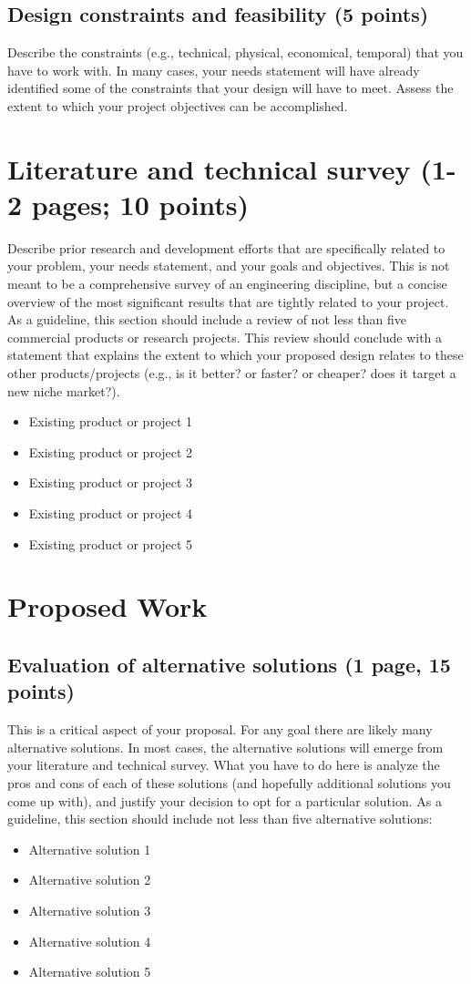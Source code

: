 \documentclass[letterpaper,12pt]{article}
\begin{document}
\subsection{Design constraints and feasibility (5 points)} Describe
the constraints (e.g., technical, physical, economical, temporal)
that you have to work with. In many cases, your needs statement will
have already identified some of the constraints that your design will
have to meet. Assess the extent to which your project objectives can
be accomplished.

\section{Literature and technical survey (1-2 pages; 10 points)} Describe
prior research and development efforts that are specifically related to
your problem, your needs statement, and your goals and objectives. This is
not meant to be a comprehensive survey of an engineering discipline, but a
concise overview of the most significant results that are tightly related
to your project. As a guideline, this section should include a review
of not less than five commercial products or research projects. This
review should conclude with a statement that explains the extent to which
your proposed design relates to these other products/projects (e.g., is
it better? or faster? or cheaper? does it target a new niche market?).
\begin{itemize} 
\item Existing product or project 1 
\item Existing product or project 2 
\item Existing product or project 3 
\item Existing product or project 4 
\item Existing product or project 5 
\end{itemize}

\section{Proposed Work}
\subsection{Evaluation of alternative solutions (1 page, 15 points)}
This is a critical aspect of your proposal. For any goal there are likely
many alternative solutions. In most cases, the alternative solutions
will emerge from your literature and technical survey. What you have
to do here is analyze the pros and cons of each of these solutions
(and hopefully additional solutions you come up with), and justify your
decision to opt for a particular solution. As a guideline, this section
should include not less than five alternative solutions:
\begin{itemize}
\item Alternative solution 1
\item Alternative solution 2
\item Alternative solution 3
\item Alternative solution 4
\item Alternative solution 5
\end{itemize}
\end{document}
